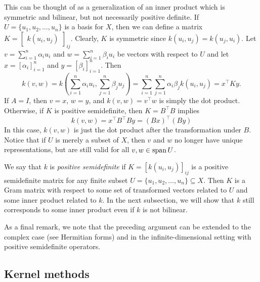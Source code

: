 This can be thought of as a generalization of an inner product which is symmetric and bilinear, but not necessarily positive definite.
If \(U = \{u_1, u_2, \dots, u_n\}\) is a basis for \(X\), then we can define a matrix \(K = \begin{bmatrix}
    k(u_i, u_j)
\end{bmatrix}_{ij}\).
Clearly, \(K\) is symmetric since \(k(u_i, u_j) = k(u_j, u_i)\).
Let \(v = \sum_{i=1}^n \alpha_i u_i\) and \(w = \sum_{i=1}^n \beta_i u_i\) be vectors with respect to \(U\) and let \(x = [\alpha_i]_{i=1}^n\) and \(y = [\beta_i]_{i=1}^n\).
Then
\begin{equation}
    \label{eqn:bilinear-form-representation}
    k(v,w)
    = k\left(\sum_{i=1}^n \alpha_i u_i, \sum_{j=1}^{n} \beta_j u_j\right)
    = \sum_{i=1}^n \sum_{j=1}^{n} \alpha_i \beta_j k\left(u_i, u_j\right)
    = x^\top K y.
\end{equation}
If \(A = I\), then \(v = x\), \(w = y\), and \(k(v,w) = v^\top w\) is simply the dot product.
Otherwise, if \(K\) is positive semidefinite, then \(K = B^\top B\) implies
\begin{equation}
    \label{eqn:bilinear-form-dot-product}
    k(v,w) = x^\top B^\top B y = (Bx)^\top (By)
\end{equation}
In this case, \(k(v,w)\) is just the dot product after the transformation under \(B\).
Notice that if \(U\) is merely a subset of \(X\), then \(v\) and \(w\) no longer have unique representations, but  are still valid for all \(v, w \in \operatorname{span} U\).

We say that \(k\) is \textit{positive semidefinite} if \(K = [k(u_i, u_j)]_{ij}\) is a positive semidefinite matrix for any finite subset \(U = \{u_1, u_2,\dots, u_n\} \subseteq X\).
Then \(K\) is a Gram matrix with respect to some set of transformed vectors related to \(U\) and some inner product related to \(k\).
In the next subsection, we will show that \(k\) still corresponds to some inner product even if \(k\) is not bilinear.

As a final remark, we note that the preceding argument can be extended to the complex case (see Hermitian forms) and in the infinite-dimensional setting with positive semidefinite operators.

\subsection{Kernel methods}

